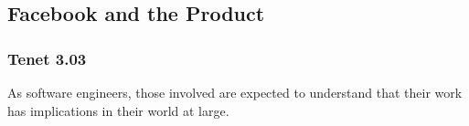 
\subsection{Facebook and the Product}

\subsubsection{Tenet 3.03}


\par As software engineers, those involved are expected to understand that their work has implications in their world at large.

